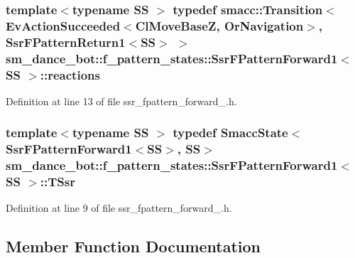 \subsubsection[{\texorpdfstring{reactions}{reactions}}]{\setlength{\rightskip}{0pt plus 5cm}template$<$typename SS $>$ typedef {\bf smacc\+::\+Transition}$<$Ev\+Action\+Succeeded$<${\bf Cl\+Move\+BaseZ}, {\bf Or\+Navigation}$>$, {\bf Ssr\+F\+Pattern\+Return1}$<$SS$>$ $>$ {\bf sm\+\_\+dance\+\_\+bot\+::f\+\_\+pattern\+\_\+states\+::\+Ssr\+F\+Pattern\+Forward1}$<$ SS $>$\+::{\bf reactions}}\hypertarget{structsm__dance__bot_1_1f__pattern__states_1_1SsrFPatternForward1_a5ab4007c8f9342d838fd51a61d263fd3}{}\label{structsm__dance__bot_1_1f__pattern__states_1_1SsrFPatternForward1_a5ab4007c8f9342d838fd51a61d263fd3}


Definition at line 13 of file ssr\+\_\+fpattern\+\_\+forward\+\_.\+h.

\subsubsection[{\texorpdfstring{T\+Ssr}{TSsr}}]{\setlength{\rightskip}{0pt plus 5cm}template$<$typename SS $>$ typedef {\bf Smacc\+State}$<${\bf Ssr\+F\+Pattern\+Forward1}$<$SS$>$, SS$>$ {\bf sm\+\_\+dance\+\_\+bot\+::f\+\_\+pattern\+\_\+states\+::\+Ssr\+F\+Pattern\+Forward1}$<$ SS $>$\+::{\bf T\+Ssr}}\hypertarget{structsm__dance__bot_1_1f__pattern__states_1_1SsrFPatternForward1_abe4bb29cc1ff55c683530635291daccd}{}\label{structsm__dance__bot_1_1f__pattern__states_1_1SsrFPatternForward1_abe4bb29cc1ff55c683530635291daccd}


Definition at line 9 of file ssr\+\_\+fpattern\+\_\+forward\+\_.\+h.



\subsection{Member Function Documentation}
